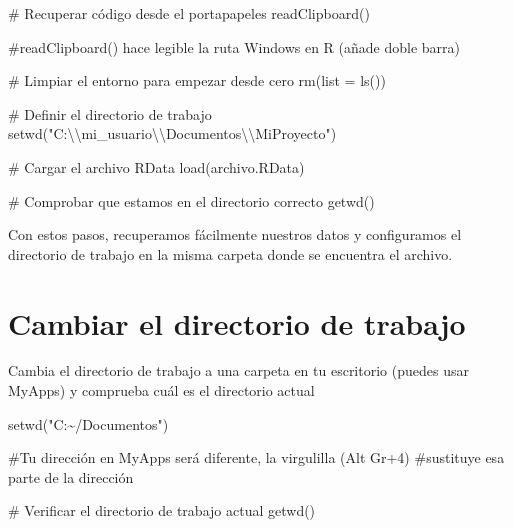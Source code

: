 \documentclass[
  letterpaper,
]{scrbook}
\newenvironment{Shaded}{\begin{snugshade}}{\end{snugshade}}
\newcommand{\AttributeTok}[1]{\textcolor[rgb]{0.40,0.45,0.13}{#1}}
\newcommand{\CommentTok}[1]{\textcolor[rgb]{0.37,0.37,0.37}{#1}}
\newcommand{\FunctionTok}[1]{\textcolor[rgb]{0.28,0.35,0.67}{#1}}
\newcommand{\NormalTok}[1]{\textcolor[rgb]{0.00,0.23,0.31}{#1}}
\newcommand{\SpecialCharTok}[1]{\textcolor[rgb]{0.37,0.37,0.37}{#1}}
\newcommand{\StringTok}[1]{\textcolor[rgb]{0.13,0.47,0.30}{#1}}
\begin{document}
\begin{Shaded}
\begin{Highlighting}[]
\CommentTok{\# Recuperar código desde el portapapeles}
\FunctionTok{readClipboard}\NormalTok{()}

\CommentTok{\#readClipboard() hace legible la ruta Windows en R (añade doble barra)}

\CommentTok{\# Limpiar el entorno para empezar desde cero}
\FunctionTok{rm}\NormalTok{(}\AttributeTok{list =} \FunctionTok{ls}\NormalTok{())}

\CommentTok{\# Definir el directorio de trabajo}
\FunctionTok{setwd}\NormalTok{(}\StringTok{"C:}\SpecialCharTok{\textbackslash{}\textbackslash{}}\StringTok{mi\_usuario}\SpecialCharTok{\textbackslash{}\textbackslash{}}\StringTok{Documentos}\SpecialCharTok{\textbackslash{}\textbackslash{}}\StringTok{MiProyecto"}\NormalTok{)}

\CommentTok{\# Cargar el archivo RData}
\FunctionTok{load}\NormalTok{(archivo.RData)}

\CommentTok{\# Comprobar que estamos en el directorio correcto}
\FunctionTok{getwd}\NormalTok{()}
\end{Highlighting}
\end{Shaded}

Con estos pasos, recuperamos fácilmente nuestros datos y configuramos el
directorio de trabajo en la misma carpeta donde se encuentra el archivo.

\hypertarget{cambiar-el-directorio-de-trabajo}{%
\chapter{Cambiar el directorio de
trabajo}\label{cambiar-el-directorio-de-trabajo}}

Cambia el directorio de trabajo a una carpeta en tu escritorio (puedes
usar MyApps) y comprueba cuál es el directorio actual

\begin{Shaded}
\begin{Highlighting}[]
\FunctionTok{setwd}\NormalTok{(}\StringTok{"C:\textasciitilde{}/Documentos"}\NormalTok{)}

\CommentTok{\#Tu dirección en MyApps será diferente, la virgulilla (Alt Gr+4) }
\CommentTok{\#sustituye esa parte de la dirección}

\CommentTok{\# Verificar el directorio de trabajo actual}
\FunctionTok{getwd}\NormalTok{()}
\end{Highlighting}
\end{Shaded}
\end{document}
